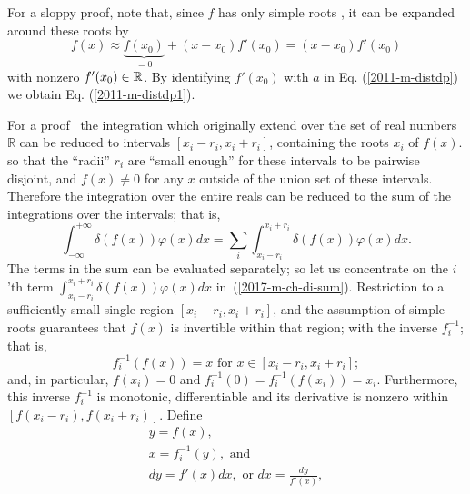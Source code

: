 {\color{OliveGreen}
\bproof
For a sloppy proof, note that, since $f$ has only simple roots
,
it can be expanded around these roots by
$$
f(x) \approx \underbrace{f(x_0)}_{=0} +(x-x_0) f'(x_0) = (x-x_0) f'(x_0)
$$
with nonzero $f'(x_0) \in {\Bbb R}$.
By identifying  $f'(x_0)$ with $a$ in
Eq. (\ref{2011-m-distdp})
we obtain
Eq. (\ref{2011-m-distdp1}).

For a proof~\cite{Cortizo-95} the integration which originally extend over the set of real numbers $\mathbb{R}$
can be reduced to intervals $[x_i-r_i,x_i+r_i]$, containing the roots $x_i$ of $f(x)$.
so that  the ``radii'' $r_i$  are ``small enough'' for these intervals to be pairwise disjoint,
and $f(x) \neq 0$ for any $x$ outside of the union set of these intervals.
Therefore the integration over the entire reals can be reduced to the sum of the integrations
over the intervals; that is,
\begin{equation}
\int_{-\infty}^{+\infty} \delta (f(x)) \varphi(x) dx
=
\sum_i
\int_{x_i-r_i}^{x_i+r_i} \delta (f(x)) \varphi(x) dx
.
\label{2017-m-ch-di-sum}
\end{equation}
The terms in the sum can be evaluated separately; so let us concentrate on the $i$'th term
$\int_{x_i-r_i}^{x_i+r_i} \delta (f(x)) \varphi(x) dx    $ in~(\ref{2017-m-ch-di-sum}).
Restriction to a sufficiently small single region $[x_i-r_i,x_i+r_i]$, and the assumption of simple roots
guarantees that $f(x)$ is invertible within that region; with the inverse $f_i^{-1}$; that is,
\begin{equation}
f_i^{-1}(f(x))=x \text{ for } x \in  [x_i-r_i,x_i+r_i]
;
\end{equation}
and, in particular, $f(x_i)=0$ and $f_i^{-1}(0) =f_i^{-1}(f(x_i))=x_i$.
Furthermore, this inverse $f_i^{-1}$ is monotonic, differentiable and its derivative is nonzero within $[f(x_i-r_i),f(x_i+r_i)]$.
Define
\begin{equation}
\begin{split}
y = f(x),\\
x = f_i^{-1} (y), \text{ and}\\
dy = f'(x) dx , \text{ or } dx = \frac{dy}{f'(x)}
,
\end{split}
\end{equation}
}
